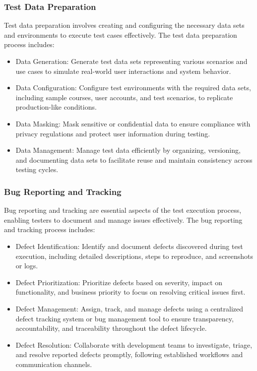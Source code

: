 		\subsubsection{Test Data Preparation}
		
		Test data preparation involves creating and configuring the necessary data sets and environments to execute test cases effectively. The test data preparation process includes:
		
		\begin{itemize}
			\item Data Generation: Generate test data sets representing various scenarios and use cases to simulate real-world user interactions and system behavior.
			\item Data Configuration: Configure test environments with the required data sets, including sample courses, user accounts, and test scenarios, to replicate production-like conditions.
			\item Data Masking: Mask sensitive or confidential data to ensure compliance with privacy regulations and protect user information during testing.
			\item Data Management: Manage test data efficiently by organizing, versioning, and documenting data sets to facilitate reuse and maintain consistency across testing cycles.
		\end{itemize}
		
		\subsubsection{Bug Reporting and Tracking}
		
		Bug reporting and tracking are essential aspects of the test execution process, enabling testers to document and manage issues effectively. The bug reporting and tracking process includes:
		
		\begin{itemize}
			\item Defect Identification: Identify and document defects discovered during test execution, including detailed descriptions, steps to reproduce, and screenshots or logs.
			\item Defect Prioritization: Prioritize defects based on severity, impact on functionality, and business priority to focus on resolving critical issues first.
			\item Defect Management: Assign, track, and manage defects using a centralized defect tracking system or bug management tool to ensure transparency, accountability, and traceability throughout the defect lifecycle.
			\item Defect Resolution: Collaborate with development teams to investigate, triage, and resolve reported defects promptly, following established workflows and communication channels.
		\end{itemize}
		
